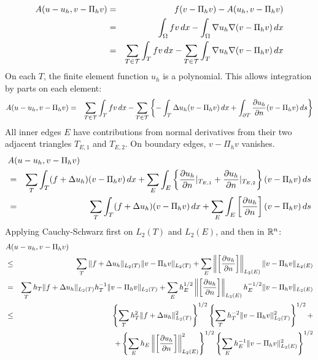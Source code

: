\begin{eqnarray*}
A(u-u_h, v-\Pi_h v) & = & f(v-\Pi_h v) - A(u_h, v - \Pi_h v) \\
        & = & \int_{\Omega} f v \, dx - \int_\Omega \nabla u_h \nabla (v - \Pi_h v) \, dx \\
        & = & \sum_{T \in \cal T} \int_{T} f v \, dx - \sum_{T \in \cal T} \int_T \nabla u_h \nabla (v - \Pi_h v) \, dx
\end{eqnarray*}
On each $T$, the finite element function $u_h$ is a polynomial. This allows 
integration by  parts on each element:
\begin{eqnarray*}
A(u-u_h, v-\Pi_h v) 
        & = & \sum_{T \in \cal T} \int_{T} f v \, dx - \sum_{T \in \cal T} 
 \left\{ -\int_T \Delta u_h (v - \Pi_h v) \, dx + \int_{\partial T} \frac{\partial u_h}{\partial n} (v - \Pi_h v) \, ds \right\}
\end{eqnarray*}
All inner edges $E$ have contributions from normal derivatives from their two adjacent triangles $T_{E,1}$ and $T_{E,2}$. On boundary edges, $v-\Pi_h v$ vanishes.
\begin{eqnarray*}
\lefteqn{A(u-u_h, v-\Pi_h v)} \\
         & = & \sum_T \int_T (f + \Delta u_h) (v - \Pi_h v) \, dx
        + \sum_E \int_E \left\{
         \frac{\partial u_h}{\partial n}|_{T_{E,1}} +
         \frac{\partial u_h}{\partial n}|_{T_{E,2}}  \right\} (v - \Pi_h v) \, ds \\
& = & \sum_T \int_T (f + \Delta u_h) (v - \Pi_h v) \, dx
        + \sum_E \int_E \left[ \frac{\partial u_h}{\partial n} \right] (v - \Pi_h v) \, ds
\end{eqnarray*}
Applying Cauchy-Schwarz first on $L_2(T)$ and $L_2(E)$, and then in ${\mathbb R}^n$:
\begin{eqnarray*}
\lefteqn{A(u-u_h, v-\Pi_h v)} \\
        & \leq & \sum_T \| f + \Delta u_h \|_{L_2(T)} \| v - \Pi_h v \|_{L_2(T)}
        + \sum_E \left\| \left[ \frac{\partial u_h}{\partial n} \right] \right\|_{L_2(E)} \| v - \Pi_h v \|_{L_2(E)} \\
        & = & \sum_T h_T \| f + \Delta u_h \|_{L_2(T)} h_T^{-1} \| v - \Pi_h v \|_{L_2(T)}
        + \sum_E h_E^{1/2} \left\| \left[ \frac{\partial u_h}{\partial n} \right] \right\|_{L_2(E)} h_E^{-1/2} \| v - \Pi_h v \|_{L_2(E)} \\
        & \leq & 
        \left\{ \sum_T h_T^2 \| f + \Delta u_h \|_{L_2(T)}^2 \right\}^{1/2}  
        \left\{ \sum_T h_T^{-2} \| v - \Pi_h v \|_{L_2(T)}^2 \right\}^{1/2} + \\
        & & + 
        \left\{ \sum_E h_E \left\| \left[ \frac{\partial u_h}{\partial n} \right] \right\|_{L_2(E)}^2 \right\}^{1/2}  
        \left\{ \sum_E h_E^{-1} \| v - \Pi_h v \|_{L_2(E)}^2 \right\}^{1/2}
\end{eqnarray*}
